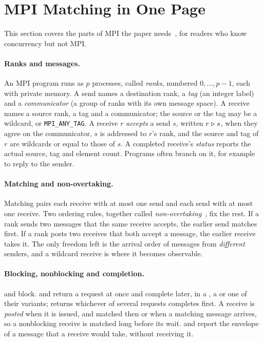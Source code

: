 \section{MPI Matching in One Page}
\label{sec:background}

This section covers the parts of MPI the paper needs~\citep{mpi50}, for readers who know
concurrency but not MPI.

\paragraph{Ranks and messages.} An MPI program runs as $p$ processes, called
\emph{ranks}, numbered $0,\dots,p-1$, each with private memory. A send names a destination
rank, a \emph{tag} (an integer label) and a \emph{communicator} (a group of ranks with its own
message space). A receive names a source rank, a tag and a communicator; the source or the tag
may be a wildcard, \anysrc or \texttt{MPI\_ANY\_TAG}. A receive $r$ \emph{accepts} a send $s$,
written $r \mathrel{\triangleright} s$, when they agree on the communicator, $s$ is addressed to $r$'s rank,
and the source and tag of $r$ are wildcards or equal to those of $s$. A completed receive's
\emph{status} reports the actual source, tag and element count. Programs often branch on it,
for example to reply to the sender.

\paragraph{Matching and non-overtaking.} Matching pairs each receive with at most one
send and each send with at most one receive. Two ordering rules, together called
\emph{non-overtaking}~\citep[§3.5]{mpi50}, fix the rest. If a rank sends two messages that
the same receive accepts, the earlier send matches first. If a rank posts two receives that
both accept a message, the earlier receive takes it. The only freedom left is the arrival
order of messages from \emph{different} senders, and a wildcard receive is where it becomes
observable.

\paragraph{Blocking, nonblocking and completion.}  and 
block.  and  return a request at once and complete later,
in a , a  or one of their variants; 
returns whichever of several requests completes first. A receive is \emph{posted} when it is
issued, and matched then or when a matching message arrives, so a nonblocking receive is
matched long before its wait.  and  report the envelope
of a message that a receive would take, without receiving it.

